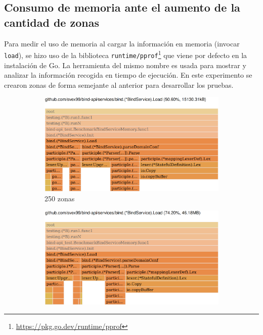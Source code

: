 \subsection{Consumo de memoria ante el aumento de la cantidad de zonas}

Para medir el uso de memoria al cargar la información en memoria (invocar \verb|load|), se hizo uso de la biblioteca \verb|runtime/pprof|\footnote{\url{https://pkg.go.dev/runtime/pprof}} que viene por defecto en la instalación de Go. La herramienta del mismo nombre es usada para mostrar y analizar la información recogida en tiempo de ejecución. En este experimento se crearon zonas de forma semejante al anterior para desarrollar los pruebas.

\begin{figure}
    \centering
    \begin{subfigure}{0.49\textwidth}
        \includegraphics[width=\textwidth]{Graphics/mem250z.png}
        \caption{250 zonas}
    \end{subfigure}
    \hfill
    \begin{subfigure}{0.49\textwidth}
        \includegraphics[width=\textwidth]{Graphics/mem500z.png}

\end{subfigure}
\end{figure}
